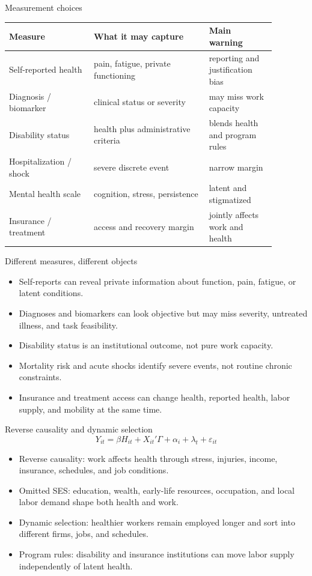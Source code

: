 \documentclass[aspectratio=169,11pt]{beamer}
\begin{document}
\begin{frame}{Measurement choices}
\small
\begin{tabular}{p{0.28\linewidth} p{0.38\linewidth} p{0.22\linewidth}}
\toprule
Measure & What it may capture & Main warning \\
\midrule
Self-reported health & pain, fatigue, private functioning & reporting and justification bias \\
Diagnosis / biomarker & clinical status or severity & may miss work capacity \\
Disability status & health plus administrative criteria & blends health and program rules \\
Hospitalization / shock & severe discrete event & narrow margin \\
Mental health scale & cognition, stress, persistence & latent and stigmatized \\
Insurance / treatment & access and recovery margin & jointly affects work and health \\
\bottomrule
\end{tabular}
\end{frame}

\begin{frame}{Different measures, different objects}
\begin{itemize}
    \item Self-reports can reveal private information about function, pain, fatigue, or latent conditions.
    \item Diagnoses and biomarkers can look objective but may miss severity, untreated illness, and task feasibility.
    \item Disability status is an institutional outcome, not pure work capacity.
    \item Mortality risk and acute shocks identify severe events, not routine chronic constraints.
    \item Insurance and treatment access can change health, reported health, labor supply, and mobility at the same time.
\end{itemize}
\end{frame}

\begin{frame}{Reverse causality and dynamic selection}
\small
\[
Y_{it} =
\beta H_{it}
+ X_{it}'\Gamma
+ \alpha_i
+ \lambda_t
+ \varepsilon_{it}
\]
\begin{itemize}
    \item Reverse causality: work affects health through stress, injuries, income, insurance, schedules, and job conditions.
    \item Omitted SES: education, wealth, early-life resources, occupation, and local labor demand shape both health and work.
    \item Dynamic selection: healthier workers remain employed longer and sort into different firms, jobs, and schedules.
    \item Program rules: disability and insurance institutions can move labor supply independently of latent health.
\end{itemize}
\end{frame}
\end{document}
